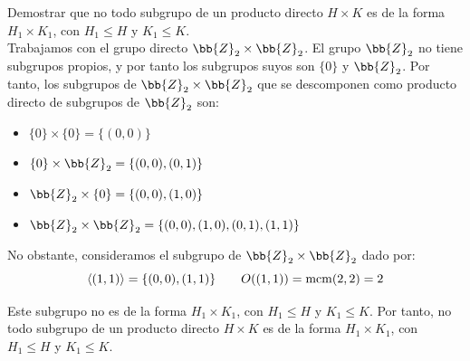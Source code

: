 \begin{ejercicio}
    Demostrar que no todo subgrupo de un producto directo $H\times K$ es de la forma $H_1\times K_1$, con $H_1\leq H$ y $K_1\leq K$.\\

    Trabajamos con el grupo directo $\bb{Z}_2\times \bb{Z}_2$. El grupo $\bb{Z}_2$ no tiene subgrupos propios, y por tanto los subgrupos suyos son $\{0\}$ y $\bb{Z}_2$. Por tanto, los subgrupos de $\bb{Z}_2\times \bb{Z}_2$ que se descomponen como producto directo de subgrupos de $\bb{Z}_2$ son:
    \begin{itemize}
        \item $\{0\}\times \{0\}=\{(0,0)\}$
        \item $\{0\}\times \bb{Z}_2=\{(0,0),(0,1)\}$
        \item $\bb{Z}_2\times \{0\}=\{(0,0),(1,0)\}$
        \item $\bb{Z}_2\times \bb{Z}_2=\{(0,0),(1,0),(0,1),(1,1)\}$
    \end{itemize}

    No obstante, consideramos el subgrupo de $\bb{Z}_2\times \bb{Z}_2$ dado por:
    \begin{equation*}
        \langle (1,1)\rangle = \{(0,0),(1,1)\}\qquad O((1,1))=\operatorname{mcm}(2,2)=2
    \end{equation*}

    Este subgrupo no es de la forma $H_1\times K_1$, con $H_1\leq H$ y $K_1\leq K$. Por tanto, no todo subgrupo de un producto directo $H\times K$ es de la forma $H_1\times K_1$, con $H_1\leq H$ y $K_1\leq K$.
\end{ejercicio}

